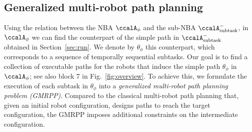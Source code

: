 \documentclass[Afour,sageh,times]{sagej}
\newtheorem{exmp}{Example}
\newcommand{\auto}[1]{\ccalA_{\textup{#1}}}
\newcommand{\autop}{\ccalA_{\phi}}
\newcommand{\vertex}[1]{v_{\textup{#1}}}
\newenvironment{cexmp}
{\addtocounter{exmp}{-1}\begin{exmp}}
  {\end{exmp}}
\begin{document}
{ %

 {\subsection{Generalized multi-robot path planning}\label{sec:mapp}
 Using the relation between the NBA  $\autop$ and the sub-NBA $\auto{subtask}^-$, in $\autop$ we can find the counterpart of the simple path in $\auto{subtask}^-$ obtained in Section~\ref{sec:run}. We denote by $\theta_{\phi}$ this counterpart, which corresponds to a sequence of temporally sequential subtasks. Our goal is to find a collection of executable paths for the robots that induce the simple path $\theta_{\phi}$ in $\autop$; see also block 7 in Fig.~\ref{fig:overview}. To achieve this, we formulate the execution of each subtask in $\theta_{\phi}$ into a {\it generalized multi-robot path planning problem (GMRPP)}. Compared to the classical multi-robot path planning that, given an initial robot configuration, designs paths to reach the target configuration, the GMRPP imposes additional constraints on the intermediate configuration.


}}
\end{document}

